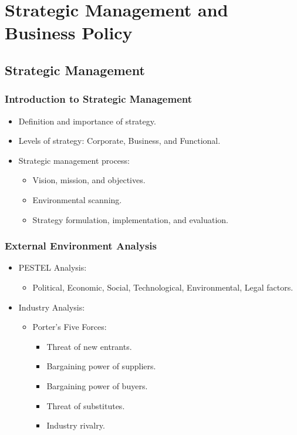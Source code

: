 \chapter{Strategic Management and Business Policy}

\section{Strategic Management}

\subsection{Introduction to Strategic Management}
\begin{itemize}
    \item Definition and importance of strategy.
    \item Levels of strategy: Corporate, Business, and Functional.
    \item Strategic management process:
    \begin{itemize}
        \item Vision, mission, and objectives.
        \item Environmental scanning.
        \item Strategy formulation, implementation, and evaluation.
    \end{itemize}
\end{itemize}

\subsection{External Environment Analysis}
\begin{itemize}
    \item PESTEL Analysis:
    \begin{itemize}
        \item Political, Economic, Social, Technological, Environmental, Legal factors.
    \end{itemize}
    \item Industry Analysis:
    \begin{itemize}
        \item Porter's Five Forces:
        \begin{itemize}
            \item Threat of new entrants.
            \item Bargaining power of suppliers.
            \item Bargaining power of buyers.
            \item Threat of substitutes.
            \item Industry rivalry.
        \end{itemize}
    \end{itemize}
\end{itemize}

